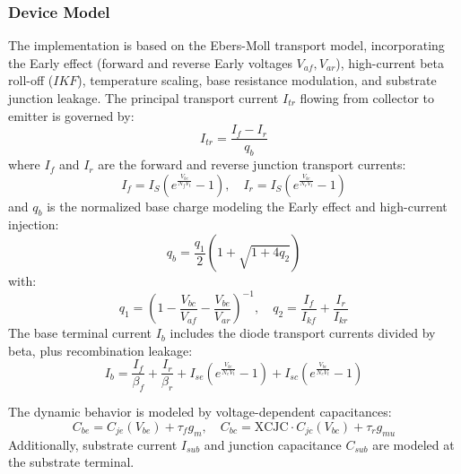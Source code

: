 \subsubsection{Device Model}
The implementation is based on the Ebers-Moll transport model, incorporating the Early effect (forward and reverse Early voltages $V_{af}, V_{ar}$), high-current beta roll-off ($IKF$), temperature scaling, base resistance modulation, and substrate junction leakage.
The principal transport current $I_{tr}$ flowing from collector to emitter is governed by:
\begin{equation}
    I_{tr} = \frac{I_f - I_r}{q_b}
\end{equation}
where $I_f$ and $I_r$ are the forward and reverse junction transport currents:
\begin{equation}
    I_f = I_S \left( e^{\frac{V_{be}}{N_f V_t}} - 1 \right), \quad I_r = I_S \left( e^{\frac{V_{bc}}{N_r V_t}} - 1 \right)
\end{equation}
and $q_b$ is the normalized base charge modeling the Early effect and high-current injection:
\begin{equation}
    q_b = \frac{q_1}{2} \left( 1 + \sqrt{1 + 4 q_2} \right)
\end{equation}
with:
\begin{equation}
    q_1 = \left( 1 - \frac{V_{bc}}{V_{af}} - \frac{V_{be}}{V_{ar}} \right)^{-1}, \quad q_2 = \frac{I_f}{I_{kf}} + \frac{I_r}{I_{kr}}
\end{equation}
The base terminal current $I_b$ includes the diode transport currents divided by beta, plus recombination leakage:
\begin{equation}
    I_b = \frac{I_f}{\beta_f} + \frac{I_r}{\beta_r} + I_{se} \left( e^{\frac{V_{be}}{N_e V_t}} - 1 \right) + I_{sc} \left( e^{\frac{V_{bc}}{N_c V_t}} - 1 \right)
\end{equation}

The dynamic behavior is modeled by voltage-dependent capacitances:
\begin{equation}
    C_{be} = C_{je}(V_{be}) + \tau_f g_m, \quad C_{bc} = \text{XCJC} \cdot C_{jc}(V_{bc}) + \tau_r g_{mu}
\end{equation}
Additionally, substrate current $I_{sub}$ and junction capacitance $C_{sub}$ are modeled at the substrate terminal.

